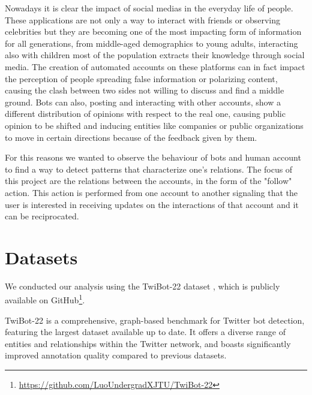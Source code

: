 \documentclass[12pt, a4paper]{article}
\begin{document}

    Nowadays it is clear the impact of social medias in the everyday life of people. These applications are not only a way to interact with friends or observing celebrities but they are becoming one of the most impacting form of information for all generations, from middle-aged demographics to young adults, interacting also with children most of the population extracts their knowledge through social media. The creation of automated accounts on these platforms can in fact impact the perception of people spreading false information or polarizing content, causing the clash between two sides not willing to discuss and find a middle ground. Bots can also, posting and interacting with other accounts, show a different distribution of opinions with respect to the real one, causing public opinion to be shifted and inducing entities like companies or public organizations to move in certain directions because of the feedback given by them.
\vspace{0.1cm}

    For this reasons we wanted to observe the behaviour of bots and human account to find a way to detect patterns that characterize one's relations. The focus of this project are the relations between the accounts, in the form of the "follow" action. This action is performed from one account to another signaling that the user is interested in receiving updates on the interactions of that account and it can be reciprocated.


\section{Datasets}
	\label{datasets}
	
	
	We conducted our analysis using the TwiBot-22 dataset \cite{twibot22}, which is publicly available on GitHub\footnote{\href{https://github.com/LuoUndergradXJTU/TwiBot-22}{https://github.com/LuoUndergradXJTU/TwiBot-22}}. 
	\vspace{0.1cm}
	
	TwiBot-22 is a comprehensive, graph-based benchmark for Twitter bot detection, featuring the largest dataset available up to date. It offers a diverse range of entities and relationships within the Twitter network, and boasts significantly improved annotation quality compared to previous datasets.
	\vspace{0.1cm}
	
\end{document}
